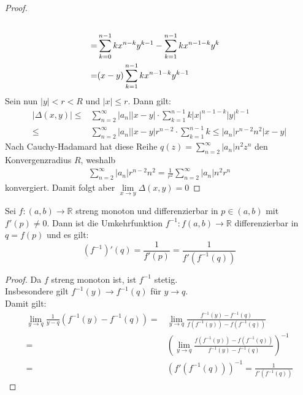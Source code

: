 \begin{proof}
\begin{align}
		\notag \\
		= & \sum_{k=0}^{n-1} k x^{n-k} y^{k-1} - \sum_{k=1}^{n-1}kx^{n-1-k}y^k 
		\notag \\
		= &(x -y) \sum_{k=1}^{n-1}kx^{n-1-k}y^{k-1} \notag
	\end{align}
	Sein nun $\vert y\vert < r < R$ und $|x| \leq r$. Dann gilt:
	\begin{align*}
		\vert \Delta(x,y)\vert \leq & 
		\sum_{n=2}^{\infty} |a_n| |x-y| \cdot \sum_{k=1}^{n-1} 
		k|x|^{n-1-k}|y|^{k-1} \\
		\leq & \sum_{n=2}^{\infty} |a_n| |x-y|r^{n-2} \cdot \sum_{k=1}^{n-1}k 
		\leq |a_n|r^{n-2}n^2|x-y|
	\end{align*}
	Nach Cauchy-Hadamard hat diese Reihe $q(z) = \sum_{n=2}^{\infty} |a_n|n^2z^n$ 
	den Konvergenzradius $R$, weshalb 
	\begin{align*}	
		\sum_{n=2}^{\infty} |a_n| r^{n-2} n^2 
		= \frac{1}{r^2}\sum_{n=2}^{\infty} |a_n|n^2r^n
	\end{align*}
	konvergiert.	Damit folgt aber $\lim\limits_{x \rightarrow y}{\Delta(x,y) = 0}$
\end{proof}

\begin{Proposition}{
	Sei $f: \left(a,b\right) \rightarrow \mathbb{R}$ streng monoton und 
	differenzierbar in $p \in \left(a, b\right)$ mit $f'\left(p\right) \neq 0$.
	Dann ist die Umkehrfunktion $f^{-1}: f\left(a,b\right) \rightarrow \mathbb{R}$
	differenzierbar in $q = f(p)$ und es gilt: 
	\begin{equation*}
		\left( f^{-1}\right)'\left(q\right) = \frac{1}{f'(p)} =
		 \frac{1}{f'(f^{-1}(q))}
	\end{equation*}
}\end{Proposition}

\begin{proof}
	Da $f$ streng monoton ist, ist $f^{-1}$  stetig. \\
	Insbesondere gilt $f^{-1}(y) \rightarrow f^{-1}(q)$ für $y \rightarrow q$.\\
	Damit gilt:
	\begin{align*}		
	 \lim\limits_{y \rightarrow q}
		{\frac{1}{y-q} \left( f^{-1}(y) - f^{-1}(q) \right) }
		= & \lim\limits_{y \rightarrow q}
		{\frac{f^{-1}(y) - f^{-1}(q)}{f(f^{-1}(y)) - f(f^{-1}(q)) }} \\
		= &\left( \lim\limits_{y \rightarrow q}
		{\frac{f(f^{-1}(y)) - f(f^{-1}(q))}
		{f^{-1}(y) - f^{-1}(q)} } \right)^{-1} \\
		= & \left(f'(f^{-1}(q))\right)^{-1}
		=  \frac{1}{f'\left( f^{-1}(q) \right)}		
	\end{align*}
\end{proof}

